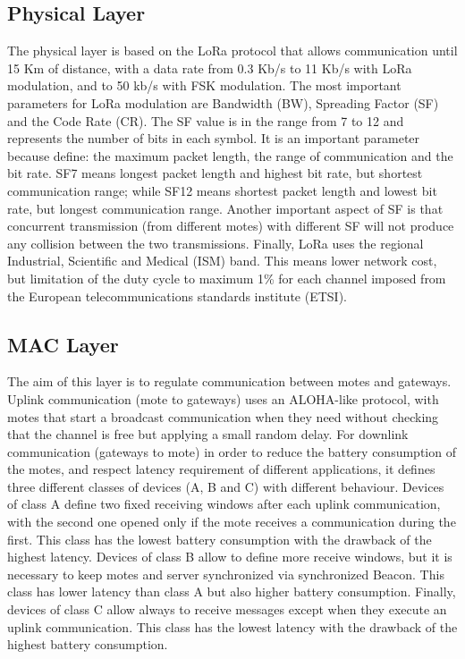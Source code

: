 \subsection{Physical Layer}
The physical layer is based on the LoRa protocol that allows communication until 15 Km of distance, with a data rate from 0.3 Kb/s to 11 Kb/s with LoRa modulation, and to 50 kb/s with FSK modulation.
% 
The most important parameters for LoRa modulation are Bandwidth (BW), Spreading Factor (SF) and the Code Rate (CR).
% 
The SF value is in the range from 7 to 12 and represents the number of bits in each symbol.
% 
It is an important parameter because define: the maximum packet length, the range of communication and the bit rate.
% 
SF7 means longest packet length and highest bit rate, but shortest communication range; while SF12 means shortest packet length and lowest bit rate, but longest communication range.
% 
Another important aspect of SF is that concurrent transmission (from different motes) with different SF will not produce any collision between the two transmissions.
% 
Finally, LoRa uses the regional Industrial, Scientific and Medical (ISM) band. This means lower network cost, but limitation of the duty \mbox{cycle} to maximum 1\% for each channel imposed from the European telecommunications standards institute (ETSI).

\subsection{MAC Layer}
The aim of this layer is to regulate communication between motes and gateways.
% 
Uplink communication (mote to gateways) uses an ALOHA-like protocol, with motes that start a broadcast communication when they need without checking that the channel is free but applying a small random delay.
% 
For downlink communication (gateways to mote) in order to reduce the battery consumption of the motes, and respect latency requirement of different applications, it defines three different classes of devices (A, B and C) with different behaviour.
% 
Devices of class A define two fixed receiving windows after each uplink communication, with the second one opened only if the mote receives a communication during the first. 
% 
This class has the lowest battery consumption with the drawback of the highest latency. 
% 
Devices of class B allow to define more receive windows, but it is necessary to keep motes and server synchronized via synchronized Beacon. 
% 
This class has lower latency than class A but also higher battery consumption. 
% 
Finally, devices of class C allow always to receive messages except when they execute an uplink communication. 
% 
This class has the lowest latency with the drawback of the highest battery consumption.

